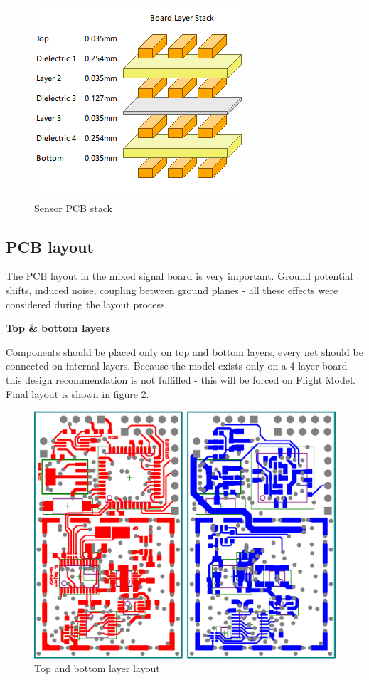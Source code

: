         \begin{figure}[H]
            \centering
            \includegraphics[width=0.3\paperwidth]{img/06/stack.png}
            \caption{Sensor PCB stack}
            \label{PCB_Altium_stack}
        \end{figure}

    \subsection{PCB layout}
        The PCB layout in the mixed signal board is very important. Ground potential shifts, induced noise, coupling between ground planes - all these effects were considered during the layout process.

        \bigskip \textbf{Top \& bottom layers}

        Components should be placed only on top and bottom layers, every net should be connected on internal layers. Because the model exists only on a 4-layer board this design recommendation is not fulfilled - this will be forced on Flight Model. Final layout is shown in figure \ref{top_bottom_layer_layout}.

        \begin{figure}[H]
            \centering
            \includegraphics[width=0.5\paperwidth]{img/06/top_bottom_layer_layout.eps}
            \caption{Top and bottom layer layout}
            \label{top_bottom_layer_layout}
        \end{figure}

